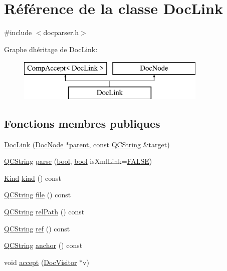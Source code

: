 \hypertarget{class_doc_link}{}\section{Référence de la classe Doc\+Link}
\label{class_doc_link}


{\ttfamily \#include $<$docparser.\+h$>$}

Graphe d\textquotesingle{}héritage de Doc\+Link\+:\begin{figure}[H]
\begin{center}
\leavevmode
\includegraphics[height=2.000000cm]{class_doc_link}
\end{center}
\end{figure}
\subsection*{Fonctions membres publiques}
\begin{DoxyCompactItemize}
\item 
\hyperlink{class_doc_link_a3639f07a695c77d818748fe711b37909}{Doc\+Link} (\hyperlink{class_doc_node}{Doc\+Node} $\ast$\hyperlink{class_doc_node_a990d8b983962776a647e6231d38bd329}{parent}, const \hyperlink{class_q_c_string}{Q\+C\+String} \&target)
\item 
\hyperlink{class_q_c_string}{Q\+C\+String} \hyperlink{class_doc_link_aeb676914fb893fa31c99b39c1f7bb6d3}{parse} (\hyperlink{qglobal_8h_a1062901a7428fdd9c7f180f5e01ea056}{bool}, \hyperlink{qglobal_8h_a1062901a7428fdd9c7f180f5e01ea056}{bool} is\+Xml\+Link=\hyperlink{qglobal_8h_a10e004b6916e78ff4ea8379be80b80cc}{F\+A\+L\+S\+E})
\item 
\hyperlink{class_doc_node_aebd16e89ca590d84cbd40543ea5faadb}{Kind} \hyperlink{class_doc_link_ac41924438e83e9b7b4c6efa5aa869ef6}{kind} () const 
\item 
\hyperlink{class_q_c_string}{Q\+C\+String} \hyperlink{class_doc_link_a147628c5f7389f6a57320a811ade7742}{file} () const 
\item 
\hyperlink{class_q_c_string}{Q\+C\+String} \hyperlink{class_doc_link_a36115421f1726ac979f5ec7335ed41aa}{rel\+Path} () const 
\item 
\hyperlink{class_q_c_string}{Q\+C\+String} \hyperlink{class_doc_link_ac1e1ed0ea1f098f0c44e56973f37745b}{ref} () const 
\item 
\hyperlink{class_q_c_string}{Q\+C\+String} \hyperlink{class_doc_link_a75a5ea2c7c96692b46c424f857bac9ab}{anchor} () const 
\item 
void \hyperlink{class_doc_link_ae9bd6b72ba2afe4ba35c4e3d854de0fa}{accept} (\hyperlink{class_doc_visitor}{Doc\+Visitor} $\ast$v)
\end{DoxyCompactItemize}
